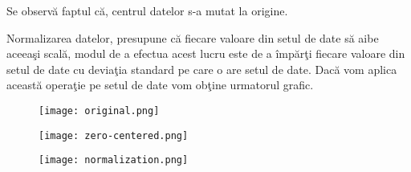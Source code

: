 Se observ\u{a} faptul c\u{a}, centrul datelor s-a mutat la origine.

Normalizarea datelor, presupune c\u{a} fiecare valoare din setul de date s\u{a} aibe aceea\c{s}i scal\u{a}, modul de a efectua acest lucru este de a \^{i}mp\u{a}r\c{t}i fiecare valoare din setul de date cu devia\c{t}ia standard pe care o are setul de date. Dac\u{a} vom aplica aceast\u{a} opera\c{t}ie pe setul de date vom ob\c{t}ine urmatorul grafic.

\begin{figure}[h!]
  \centering
  \texttt{[image: original.png]}
\end{figure}

\begin{figure}[h!]
  \centering
  \texttt{[image: zero-centered.png]}
\end{figure}

\begin{figure}[h!]
  \centering
  \texttt{[image: normalization.png]}
\end{figure}
